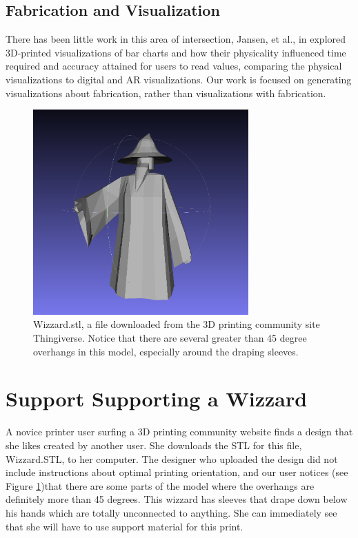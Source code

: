 \documentclass{sigchi}
\begin{document}
\subsection{Fabrication and Visualization}
There has been little work in this area of intersection, Jansen, et al., in \cite{jansen-physvis} explored 3D-printed visualizations of bar charts and how their physicality influenced time required and accuracy attained for users to read values, comparing the physical visualizations to digital and AR visualizations.  Our work is focused on generating visualizations about fabrication, rather than visualizations with fabrication.

\begin{figure}
\centering
\includegraphics[width=3.25in]{images/wizzard.png}
\caption{Wizzard.stl, a file downloaded from the 3D printing community site Thingiverse.  Notice that there are several greater than 45 degree overhangs in this model, especially around the draping sleeves.}
\label{fig:wizzard}
\end{figure}

\section{Support Supporting a Wizzard}
A novice printer user surfing a 3D printing community website finds a design that she likes created by another user.  She downloads the STL for this file, Wizzard.STL, to her computer.  The designer who uploaded the design did not include instructions about optimal printing orientation, and our user notices (see Figure \ref{fig:wizzard})that there are some parts of the model where the overhangs are definitely more than 45 degrees.  This wizzard has sleeves that drape down below his hands which are totally unconnected to anything.  She can immediately see that she will have to use support material for this print.
\end{document}

